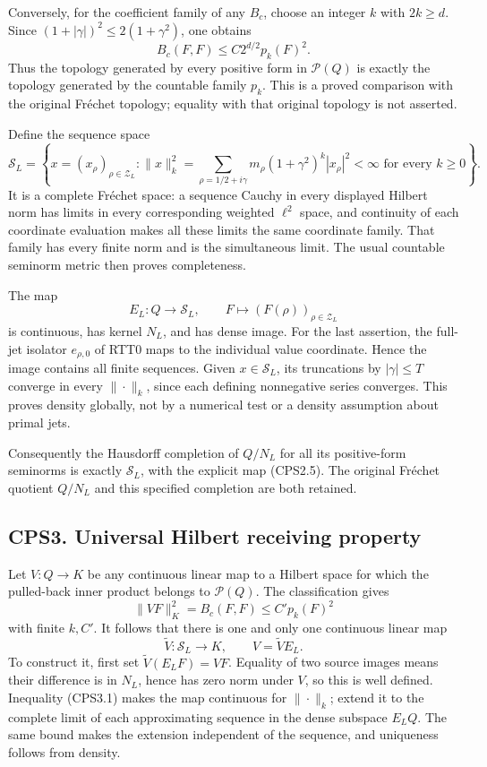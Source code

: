 Conversely, for the coefficient family of any \(B_c\), choose an integer
\(k\) with \(2k\ge d\). Since \((1+|\gamma|)^2\le2(1+\gamma^2)\), one
obtains \[
B_c(F,F)\le C2^{d/2}p_k(F)^2.
\tag{CPS2.3}
\] Thus the topology generated by every positive form in
\(\mathscr P(Q)\) is exactly the topology generated by the countable
family \(p_k\). This is a proved comparison with the original Fréchet
topology; equality with that original topology is not asserted.

Define the sequence space \[
\mathcal S_L=
\left\{x=(x_\rho)_{\rho\in\mathscr Z_L}:
\|x\|_k^2=\sum_{\rho=1/2+i\gamma}m_\rho
(1+\gamma^2)^k|x_\rho|^2<\infty
\text{ for every }k\ge0\right\}.
\tag{CPS2.4}
\] It is a complete Fréchet space: a sequence Cauchy in every displayed
Hilbert norm has limits in every corresponding weighted \(\ell^2\)
space, and continuity of each coordinate evaluation makes all these
limits the same coordinate family. That family has every finite norm and
is the simultaneous limit. The usual countable seminorm metric then
proves completeness.

The map \[
E_L:Q\longrightarrow\mathcal S_L,\qquad
F\longmapsto(F(\rho))_{\rho\in\mathscr Z_L}
\tag{CPS2.5}
\] is continuous, has kernel \(N_L\), and has dense image. For the last
assertion, the full-jet isolator \(e_{\rho,0}\) of RTT0 maps to the
individual value coordinate. Hence the image contains all finite
sequences. Given \(x\in\mathcal S_L\), its truncations by
\(|\gamma|\le T\) converge in every \(\|\cdot\|_k\), since each defining
nonnegative series converges. This proves density globally, not by a
numerical test or a density assumption about primal jets.

Consequently the Hausdorff completion of \(Q/N_L\) for all its
positive-form seminorms is exactly \(\mathcal S_L\), with the explicit
map (CPS2.5). The original Fréchet quotient \(Q/N_L\) and this specified
completion are both retained.

\subsection{CPS3. Universal Hilbert receiving
property}\label{cps3.-universal-hilbert-receiving-property}

Let \(V:Q\to K\) be any continuous linear map to a Hilbert space for
which the pulled-back inner product belongs to \(\mathscr P(Q)\). The
classification gives \[
\|VF\|_K^2=B_c(F,F)\le C' p_k(F)^2
\tag{CPS3.1}
\] with finite \(k,C'\). It follows that there is one and only one
continuous linear map \[
\widetilde V:\mathcal S_L\longrightarrow K,
\qquad V=\widetilde V E_L.
\tag{CPS3.2}
\] To construct it, first set \(\widetilde V(E_LF)=VF\). Equality of two
source images means their difference is in \(N_L\), hence has zero norm
under \(V\), so this is well defined. Inequality (CPS3.1) makes the map
continuous for \(\|\cdot\|_k\); extend it to the complete limit of each
approximating sequence in the dense subspace \(E_LQ\). The same bound
makes the extension independent of the sequence, and uniqueness follows
from density.

